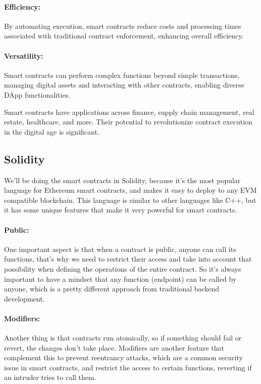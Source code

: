 \paragraph{Efficiency:}
By automating execution, smart contracts reduce costs and processing times
associated with traditional contract enforcement, enhancing overall efficiency.

\paragraph{Versatility:}
Smart contracts can perform complex functions beyond simple transactions,
managing digital assets and interacting with other contracts, enabling diverse
DApp functionalities.

Smart contracts have applications across finance, supply chain management, real
estate, healthcare, and more. Their potential to revolutionize contract
execution in the digital age is significant.

\subsection{Solidity}
\label{subsec:solidity}

We'll be doing the smart contracts in Solidity, because it's the most popular
language for Ethereum smart contracts, and makes it easy to deploy to any EVM
compatible blockchain. This language is similar to other languages like C++,
but it has some unique features that make it very powerful for smart contracts.

\paragraph{Public:} One important aspect is that when a contract is public, anyone can call its
functions, that's why we need to restrict their access and take into account
that possibility when defining the operations of the entire contract. So it's
always important to have a mindset that any function (endpoint) can be called
by anyone, which is a pretty different approach from traditional backend
development.

\paragraph{Modifiers:} Another thing is that contracts run atomically, so if something should fail or
revert, the changes don't take place. Modifiers are another feature that
complement this to prevent reentrancy attacks, which are a common security
issue in smart contracts, and restrict the access to certain functions,
reverting if an intruder tries to call them.

